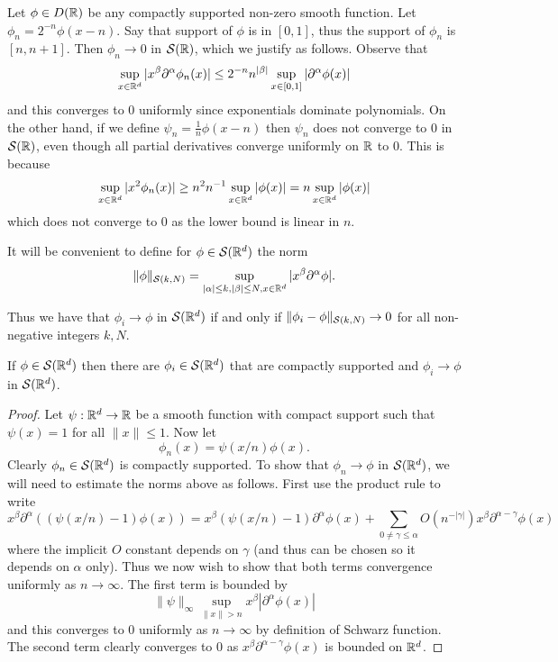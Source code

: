 \documentclass[twoside, a4paper, 10pt]{amsart}
\begin{document}
\begin{eg} \label{eg: schwarz convergence} Let $\phi \in D(\mathbb{R})$ be any compactly supported non-zero smooth function. Let $\phi_n = 2^{-n} \phi(x-n)$. Say that support of $\phi$ is in $[0,1]$, thus the support of $\phi_n$ is $[n,n+1]$. Then $\phi_n \to 0$ in $\mathcal{S}(\mathbb{R})$, which we justify as follows. Observe that $$\sup_{x \in \mathbb{R}^d}|x^{\beta} \partial^{\alpha}\phi_n(x)| \leq 2^{-n}n^{|\beta|} \sup_{x \in [0,1]} | \partial^{\alpha}\phi(x)|$$ and this converges to $0$ uniformly since exponentials dominate polynomials. On the other hand, if we define $\psi_n = \frac{1}{n} \phi(x-n)$ then $\psi_n$ does not converge to $0$ in $\mathcal{S}(\mathbb{R})$, even though all partial derivatives converge uniformly on $\mathbb{R}$ to $0$. This is because $$\sup_{x \in \mathbb{R}^d} | x^2 \phi_n(x) | \geq n^2 n^{-1} \sup_{x \in \mathbb{R}^d} |\phi(x)| = n \sup_{x \in \mathbb{R}^d} |\phi(x)|$$ which does not converge to $0$ as the lower bound is linear in $n$.

\end{eg}

\begin{mydef} It will be convenient to define for $\phi \in \mathcal{S}(\mathbb{R}^d)$ the norm $$\| \phi \|_{\mathcal{S}(k,N)} = \sup_{|\alpha|\leq k, |\beta|\leq N, x \in \mathbb{R}^d} |x^{\beta} \partial^{\alpha} \phi| .$$

\end{mydef}

Thus we have that $\phi_i \to \phi$ in $\mathcal{S}(\mathbb{R}^d)$ if and only if $\| \phi_i - \phi\|_{\mathcal{S}(k,N)} \to 0$ for all non-negative integers $k,N$.

\begin{prop}\label{prop: Schwarz function is limit of compactly supported} If $\phi \in \mathcal{S}(\mathbb{R}^d)$ then there are $\phi_i \in \mathcal{S}(\mathbb{R}^d)$ that are compactly supported and $\phi_i \to \phi$ in $\mathcal{S}(\mathbb{R}^d)$.

\end{prop} 

\begin{proof} Let $\psi:\mathbb{R}^d \to \mathbb{R}$ be a smooth function with compact support such that $\psi(x) = 1$ for all $\|x \| \leq 1$. Now let $$\phi_n(x) = \psi(x/n) \phi(x).$$ Clearly $\phi_n \in \mathcal{S}(\mathbb{R}^d)$ is compactly supported. To show that $\phi_n \to \phi$ in $\mathcal{S}(\mathbb{R}^d)$, we will need to estimate the norms above as follows. First use the product rule to write $$x^{\beta} \partial^{\alpha}\left( (\psi(x/n) - 1) \phi(x) \right) =  x^{\beta} (\psi(x/n) - 1) \partial^{\alpha} \phi(x)  + \sum_{0 \neq \gamma \leq \alpha} O(n^{-|\gamma|}) x^{\beta}\partial^{\alpha - \gamma} \phi(x) $$ where the implicit $O$ constant depends on $\gamma$ (and thus can be chosen so it depends on $\alpha$ only). Thus we now wish to show that both terms convergence uniformly as $n \to \infty$. The first term is bounded by $$\|\psi\|_{\infty} \sup_{\|x\| > n} x^{\beta}  |\partial^{\alpha} \phi(x)|$$ and this converges to $0$ uniformly as $n \to \infty$ by definition of Schwarz function. The second term clearly converges to $0$ as $x^{\beta} \partial^{\alpha - \gamma}\phi(x)$ is bounded on $\mathbb{R}^d$. \end{proof}
\end{document}
